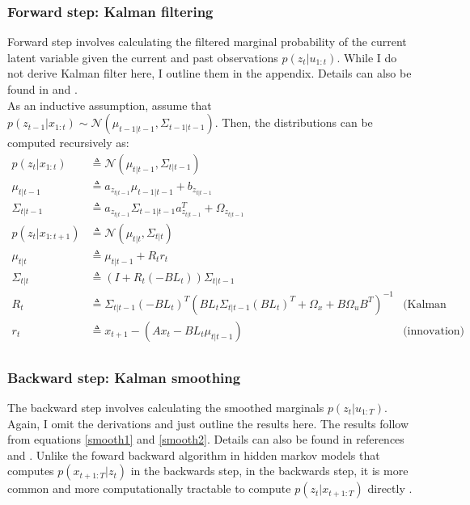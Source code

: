 \documentclass[11pt, reqno]{article}
\numberwithin{equation}{section}
\begin{document}
\subsubsection{Forward step: Kalman filtering}
Forward step involves calculating the filtered marginal probability of the current latent variable given the current and past observations $p(z_t | u_{1:t})$. While I do not derive Kalman filter here, I outline them in the appendix. Details can also be found in \cite{Murphy2012} and \cite{Jordan2007}. \\

As an inductive assumption, assume that $p(z_{t-1} | x_{1:t}) \sim  \mathcal{N}(\mu_{t-1|t-1}, \Sigma_{t-1|t-1})$. Then, the distributions can be computed recursively as:
\begin{align*}
p(z_{t} | x_{1:t}) &\triangleq  \mathcal{N}\left( \mu_{t|t-1},  \Sigma_{t|t-1}\right)\\
\mu_{t|t-1} &\triangleq a_{z_{t|t-1}}\mu_{t-1|t-1} + b_{z_{t|t-1}} \\
\Sigma_{t|t-1} &\triangleq  a_{z_{t|t-1}} \Sigma_{t-1|t-1} a_{z_{t|t-1}}^T + \Omega_{z_{t|t-1}}\\
p(z_{t} | x_{1:t+1}) &\triangleq \mathcal{N}\left( \mu_{t|t},  \Sigma_{t|t}\right)\\
\mu_{t|t} &\triangleq \mu_{t|t-1} + R_{t}r_{t} \\
\Sigma_{t|t} &\triangleq  \left( I + R_{t}(-BL_t) \right) \Sigma_{t|t-1}\\
R_{t} 
&\triangleq \Sigma_{t|t-1} (-BL_t)^T  \left(BL_t \Sigma_{t|t-1}(BL_t)^T + \Omega_x + B \Omega_u B^T  \right)^{-1} &\text{(Kalman filter)} \\
r_{t} &\triangleq  x_{t+1} - (Ax_{t} - BL_t \mu_{t|t-1}) &\text{(innovation)}\\
\end{align*}

\subsubsection{Backward step: Kalman smoothing}
The backward step involves calculating the smoothed marginals  $p(z_t | u_{1:T})$. Again, I omit the derivations and just outline the results here. The results follow from equations \ref{smooth1} and \ref{smooth2}. Details can also be found in references \cite{Murphy2012} and \cite{Jordan2007}.  Unlike the foward backward algorithm in hidden markov models that computes $p(x_{t+1:T} | z_t)$ in the backwards step, in the backwards step, it is more common and more computationally tractable to compute $p(z_t | x_{t+1:T})$ directly \cite{Murphy2012}. \\
\end{document}
